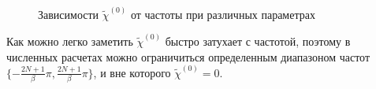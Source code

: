 \documentclass[11pt,a4paper]{report}
\begin{document}
\begin{figure}[H]
\centering
{}
\caption[]{Зависимости $\tilde{\chi}^{(0)}$ от частоты при различных параметрах}
\end{figure}

Как можно легко заметить $\tilde{\chi}^{(0)}$ быстро затухает с частотой, поэтому в численных расчетах можно ограничиться определенным диапазоном частот $\{-\frac{2N+1}{\beta}\pi,\frac{2N+1}{\beta}\pi\}$, и вне которого $\tilde{\chi}^{(0)} = 0$.
\end{document}
